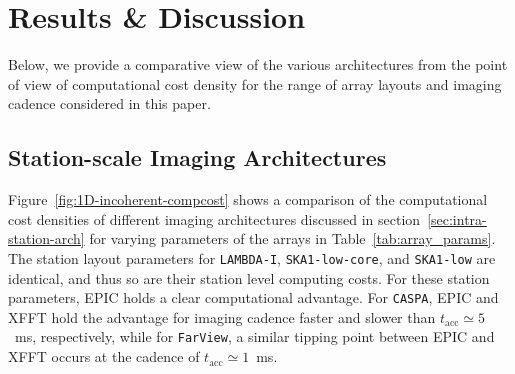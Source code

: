 \documentclass[
  journal=pasa,
  manuscript=article-type,
  year=2020,
  volume=37,
]{cup-journal}
\begin{document}




\section{Results \& Discussion} \label{sec:results}

Below, we provide a comparative view of the various architectures from the point of view of computational cost density for the range of array layouts and imaging cadence considered in this paper. 

\subsection{Station-scale Imaging Architectures}\label{sec:station-scale-imaging}

Figure~\ref{fig:1D-incoherent-compcost} shows a comparison of the computational cost densities of different imaging architectures discussed in section~\ref{sec:intra-station-arch} for varying parameters of the arrays in Table~\ref{tab:array_params}. The station layout parameters for \texttt{LAMBDA-I}, \texttt{SKA1-low-core}, and \texttt{SKA1-low} are identical, and thus so are their station level computing costs. For these station parameters, EPIC holds a clear computational advantage. For \texttt{CASPA}, EPIC and XFFT hold the advantage for imaging cadence faster and slower than $t_\textrm{acc}\simeq 5$~ms, respectively, while for \texttt{FarView}, a similar tipping point between EPIC and XFFT occurs at the cadence of $t_\textrm{acc}\simeq 1$~ms.
\end{document}
